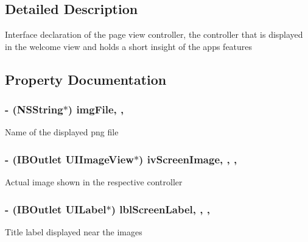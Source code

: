 \subsection{Detailed Description}
Interface declaration of the page view controller, the controller that is displayed in the welcome view and holds a short insight of the app\textquotesingle{}s features 

\subsection{Property Documentation}
\hypertarget{interface_e_s_page_view_controller_ac2b73c2572d8221b108e2c7a79d7e4eb}{}
\subsubsection[{img\+File}]{\setlength{\rightskip}{0pt plus 5cm}-\/ (N\+S\+String$\ast$) img\+File\hspace{0.3cm}{\ttfamily [read]}, {\ttfamily [write]}, {\ttfamily [atomic]}}\label{interface_e_s_page_view_controller_ac2b73c2572d8221b108e2c7a79d7e4eb}
Name of the displayed png file \hypertarget{interface_e_s_page_view_controller_af89fee72967118c2b6223647191cf380}{}
\subsubsection[{iv\+Screen\+Image}]{\setlength{\rightskip}{0pt plus 5cm}-\/ (I\+B\+Outlet U\+I\+Image\+View$\ast$) iv\+Screen\+Image\hspace{0.3cm}{\ttfamily [read]}, {\ttfamily [write]}, {\ttfamily [nonatomic]}, {\ttfamily [strong]}}\label{interface_e_s_page_view_controller_af89fee72967118c2b6223647191cf380}
Actual image shown in the respective controller \hypertarget{interface_e_s_page_view_controller_a37a2106faf34602108ad2d3303ab8bdc}{}
\subsubsection[{lbl\+Screen\+Label}]{\setlength{\rightskip}{0pt plus 5cm}-\/ (I\+B\+Outlet U\+I\+Label$\ast$) lbl\+Screen\+Label\hspace{0.3cm}{\ttfamily [read]}, {\ttfamily [write]}, {\ttfamily [nonatomic]}, {\ttfamily [strong]}}\label{interface_e_s_page_view_controller_a37a2106faf34602108ad2d3303ab8bdc}
Title label displayed near the images \hypertarget{interface_e_s_page_view_controller_ac253c976e1b82035d6205b1abcbe18bc}{}
